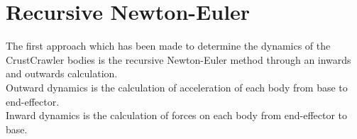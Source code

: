 \section{Recursive Newton-Euler}
The first approach which has been made to determine the dynamics of the CrustCrawler bodies is the recursive Newton-Euler method through an inwards and outwards calculation. \\
Outward dynamics is the calculation of acceleration of each body from base to end-effector.\\
Inward dynamics is the calculation of forces on each body from end-effector to base.\\

